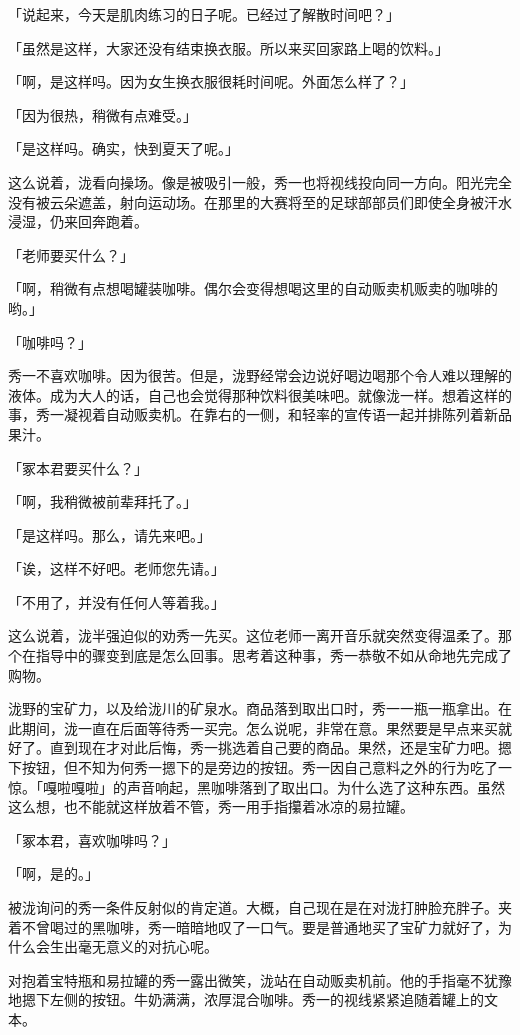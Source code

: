 \documentclass[UTF8]{ctexart}
\begin{document}
    「说起来，今天是肌肉练习的日子呢。已经过了解散时间吧？」

    「虽然是这样，大家还没有结束换衣服。所以来买回家路上喝的饮料。」

    「啊，是这样吗。因为女生换衣服很耗时间呢。外面怎么样了？」

    「因为很热，稍微有点难受。」

    「是这样吗。确实，快到夏天了呢。」

    这么说着，泷看向操场。像是被吸引一般，秀一也将视线投向同一方向。阳光完全没有被云朵遮盖，射向运动场。在那里的大赛将至的足球部部员们即使全身被汗水浸湿，仍来回奔跑着。

    「老师要买什么？」

    「啊，稍微有点想喝罐装咖啡。偶尔会变得想喝这里的自动贩卖机贩卖的咖啡的哟。」

    「咖啡吗？」

    秀一不喜欢咖啡。因为很苦。但是，泷野经常会边说好喝边喝那个令人难以理解的液体。成为大人的话，自己也会觉得那种饮料很美味吧。就像泷一样。想着这样的事，秀一凝视着自动贩卖机。在靠右的一侧，和轻率的宣传语一起并排陈列着新品果汁。

    「冢本君要买什么？」

    「啊，我稍微被前辈拜托了。」

    「是这样吗。那么，请先来吧。」

    「诶，这样不好吧。老师您先请。」

    「不用了，并没有任何人等着我。」

    这么说着，泷半强迫似的劝秀一先买。这位老师一离开音乐就突然变得温柔了。那个在指导中的骤变到底是怎么回事。思考着这种事，秀一恭敬不如从命地先完成了购物。

    泷野的宝矿力，以及给泷川的矿泉水。商品落到取出口时，秀一一瓶一瓶拿出。在此期间，泷一直在后面等待秀一买完。怎么说呢，非常在意。果然要是早点来买就好了。直到现在才对此后悔，秀一挑选着自己要的商品。果然，还是宝矿力吧。摁下按钮，但不知为何秀一摁下的是旁边的按钮。秀一因自己意料之外的行为吃了一惊。「嘎啦嘎啦」的声音响起，黑咖啡落到了取出口。为什么选了这种东西。虽然这么想，也不能就这样放着不管，秀一用手指攥着冰凉的易拉罐。

    「冢本君，喜欢咖啡吗？」

    「啊，是的。」

    被泷询问的秀一条件反射似的肯定道。大概，自己现在是在对泷打肿脸充胖子。夹着不曾喝过的黑咖啡，秀一暗暗地叹了一口气。要是普通地买了宝矿力就好了，为什么会生出毫无意义的对抗心呢。

    对抱着宝特瓶和易拉罐的秀一露出微笑，泷站在自动贩卖机前。他的手指毫不犹豫地摁下左侧的按钮。牛奶满满，浓厚混合咖啡。秀一的视线紧紧追随着罐上的文本。
\end{document}
